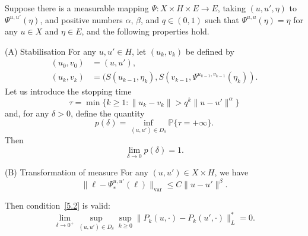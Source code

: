 \documentclass[JEP,XML,SOM,Unicode,ThmDefs]{cedram}
\theoremstyle{plain}
\numberwithin{equation}{section}
\newcommand{\IP}{{\mathbb P}}
\begin{document}
\begin{theorem} \label{T:1.2}
Suppose there is a measurable mapping $\varPsi:X\times H\times E\to E$, taking $(u,u',\eta)$ to~$\varPsi^{u,u'}(\eta)$, and positive numbers $\alpha$, $\beta$, and $q\in(0,1)$ such that $\varPsi^{u,u}(\eta)=\eta$ for any $u\in X$ and $\eta\in E$, and the following properties hold.
\begin{enonce*}{\hypertarget{(A)}{(A)} Stabilisation}
For any $u,u'\in H$, let $(u_k,v_k)$ be defined by\vspace*{-3pt}
\begin{align}
(u_0,v_0)&=(u,u'), \label{1.8}\\
(u_k,v_k)&=(S(u_{k-1},\eta_k),S(v_{k-1},\varPsi^{u_{k-1},v_{k-1}}(\eta_k)).
\label{1.9}
\end{align}
Let us introduce the stopping time\vspace*{-3pt}
\begin{equation} \label{tau}
\tau=\min\bigl\{k\ge1:\|u_k-v_k\|> q^{k}\|u-u'\|^\alpha\bigr\}
\end{equation}
and, for any $\delta>0$, define the quantity\vspace*{-3pt}
\[
p(\delta)=\inf_{(u,u')\in D_\delta}\IP\{\tau=+\infty\}.
\]
Then\vspace*{-3pt}
\begin{equation} \label{1.10}
\lim_{\delta\to0} p(\delta)=1.
\end{equation}
\end{enonce*}
\begin{enonce*}{\hypertarget{(B)}{(B)} Transformation of measure}
For any $(u,u')\in X\times H$, we have\vspace*{-3pt}
\begin{equation} \label{1.12}
\|\ell-\varPsi_*^{u,u'}(\ell)\|_{\mathrm{var}}\le C \|u-u'\|^\beta.
\end{equation}
\end{enonce*}
Then condition~\eqref{5.2} is valid:\vspace*{-3pt}
\begin{equation} \label{107}
\lim_{\delta\to0^+}\sup_{(u,u')\in D_\delta}\sup_{k\ge0}
\|P_k(u,\cdot)-P_k(u',\cdot)\|_L^*=0.
\end{equation}
\end{theorem}
\end{document}
